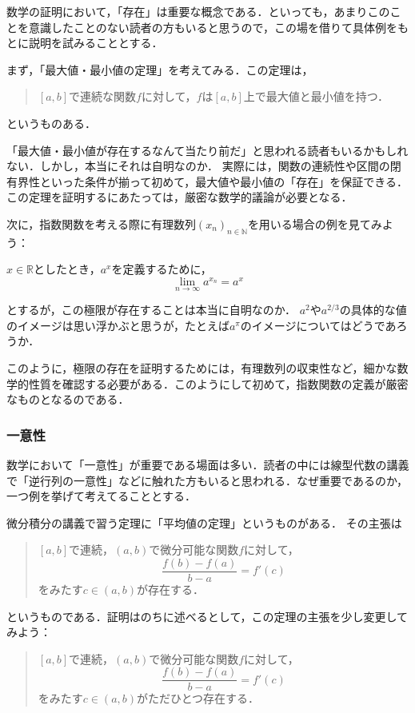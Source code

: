 \documentclass[a4paper,11pt]{ltjsarticle}
\begin{document}
数学の証明において，「存在」は重要な概念である．といっても，あまりこのことを意識したことのない読者の方もいると思うので，この場を借りて具体例をもとに説明を試みることとする．

まず，「最大値・最小値の定理」を考えてみる．この定理は，
\begin{quotation}
	$[a,b]$で連続な関数$f$に対して，$f$は$[a,b]$上で最大値と最小値を持つ．
\end{quotation}
というものある．

「最大値・最小値が存在するなんて当たり前だ」と思われる読者もいるかもしれない．しかし，本当にそれは自明なのか．
実際には，関数の連続性や区間の閉有界性といった条件が揃って初めて，最大値や最小値の「存在」を保証できる．この定理を証明するにあたっては，厳密な数学的議論が必要となる．

次に，指数関数を考える際に有理数列$(x_n)_{n \in \mathbb{N}}$を用いる場合の例を見てみよう：

$x \in \mathbb{R}$としたとき，$a^x$を定義するために，
\[
	\lim_{n \to \infty} a^{x_n} = a^x
\]

とするが，この極限が存在することは本当に自明なのか．
$a^2$や$a^{2/3}$の具体的な値のイメージは思い浮かぶと思うが，たとえば$a^{\pi}$のイメージについてはどうであろうか．

このように，極限の存在を証明するためには，有理数列の収束性など，細かな数学的性質を確認する必要がある．このようにして初めて，指数関数の定義が厳密なものとなるのである．

\subsubsection{一意性}

数学において「一意性」が重要である場面は多い．読者の中には線型代数の講義で「逆行列の一意性」などに触れた方もいると思われる．なぜ重要であるのか，一つ例を挙げて考えてることとする．

微分積分の講義で習う定理に「平均値の定理」というものがある．
その主張は
\begin{quotation}
	$[a,b]$で連続，$(a,b)$で微分可能な関数$f$に対して，
	\[
	\frac{f(b)-f(a)}{b-a}=f'(c)
	\]
	をみたす$ c \in (a,b)$が存在する．
\end{quotation}

というものである．証明はのちに述べるとして，この定理の主張を少し変更してみよう：

\begin{quotation}
	$[a,b]$で連続，$(a,b)$で微分可能な関数$f$に対して，
	\[
	\frac{f(b)-f(a)}{b-a}=f'(c)
	\]
	をみたす$ c \in (a,b)$がただひとつ存在する．
\end{quotation}
\end{document}
